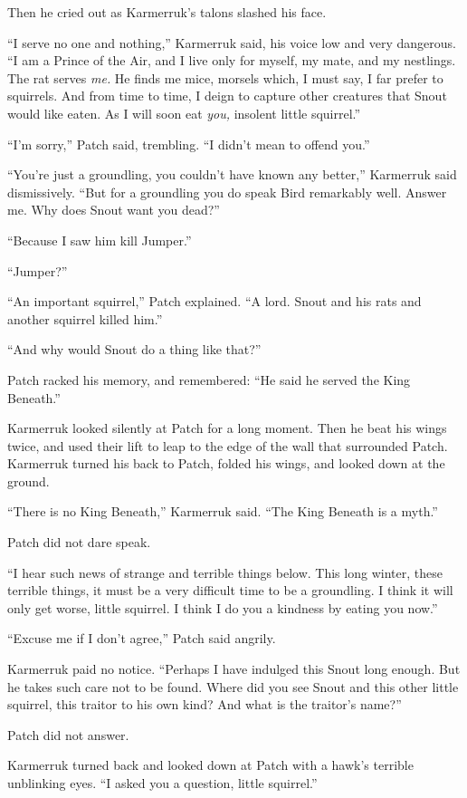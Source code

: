 \documentclass[ebook,oneside,openany,17pt]{memoir}
\begin{document}
Then he cried out as Karmerruk’s talons slashed his face.

“I serve no one and nothing,” Karmerruk said, his voice low and very
dangerous. “I am a Prince of the Air, and I live only for myself, my
mate, and my nestlings. The rat serves \emph{me.} He finds me mice,
morsels which, I must say, I far prefer to squirrels. And from time to
time, I deign to capture other creatures that Snout would like
eaten. As I will soon eat \emph{you,} insolent little squirrel.”

“I’m sorry,” Patch said, trembling. “I didn’t mean to offend you.”

“You’re just a groundling, you couldn’t have known any better,”
Karmerruk said dismissively. “But for a groundling you do speak Bird
remarkably well. Answer me. Why does Snout want you dead?”

“Because I saw him kill Jumper.”

“Jumper?”

“An important squirrel,” Patch explained. “A lord. Snout and his rats
and another squirrel killed him.”

“And why would Snout do a thing like that?”

Patch racked his memory, and remembered: “He said he served the King
Beneath.”

Karmerruk looked silently at Patch for a long moment. Then he beat his
wings twice, and used their lift to leap to the edge of the wall that
surrounded Patch. Karmerruk turned his back to Patch, folded his
wings, and looked down at the ground.

“There is no King Beneath,” Karmerruk said. “The King Beneath is a
myth.”

Patch did not dare speak.

“I hear such news of strange and terrible things below. This long
winter, these terrible things, it must be a very difficult time to be
a groundling. I think it will only get worse, little squirrel. I think
I do you a kindness by eating you now.”

“Excuse me if I don’t agree,” Patch said angrily.

Karmerruk paid no notice. “Perhaps I have indulged this Snout long
enough. But he takes such care not to be found. Where did you see
Snout and this other little squirrel, this traitor to his own kind?
And what is the traitor’s name?”

Patch did not answer.

Karmerruk turned back and looked down at Patch with a hawk’s terrible
unblinking eyes. “I asked you a question, little squirrel.”
\end{document}

